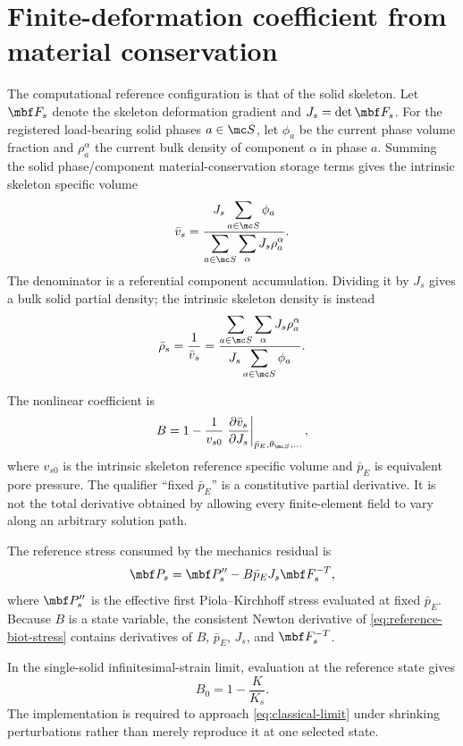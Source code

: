 \section{Finite-deformation coefficient from material conservation}

The computational reference configuration is that of the solid skeleton.  Let
\(\mbf F_s\) denote the skeleton deformation gradient and
\(J_s=\det\mbf F_s\).  For the registered load-bearing solid phases
\(a\in\mc S\), let \(\phi_a\) be the current phase volume fraction and
\(\rho_a^\alpha\) the current bulk density of component \(\alpha\) in phase
\(a\).  Summing the solid phase/component material-conservation storage terms
gives the intrinsic skeleton specific volume
\begin{equation}
 \bar v_s=
 \frac{J_s\displaystyle\sum_{a\in\mc S}\phi_a}
 {\displaystyle\sum_{a\in\mc S}\sum_\alpha J_s\rho_a^\alpha}.
 \label{eq:summed-specific-volume}
\end{equation}
The denominator is a referential component accumulation.  Dividing it by
\(J_s\) gives a bulk solid partial density; the intrinsic skeleton density is
instead
\begin{equation}
 \bar\rho_s=\frac{1}{\bar v_s}=
 \frac{\displaystyle\sum_{a\in\mc S}\sum_\alpha J_s\rho_a^\alpha}
 {J_s\displaystyle\sum_{a\in\mc S}\phi_a}.
 \label{eq:intrinsic-density}
\end{equation}

The nonlinear coefficient is
\begin{equation}
 B=1-\frac{1}{v_{s0}}
 \left.\frac{\partial\bar v_s}{\partial J_s}\right|_{\bar p_E,\theta_{\mc S},\ldots},
 \label{eq:nonlinear-biot}
\end{equation}
where \(v_{s0}\) is the intrinsic skeleton reference specific volume and
\(\bar p_E\) is equivalent pore pressure. The qualifier ``fixed
\(\bar p_E\)'' is a
constitutive partial derivative.  It is not the total derivative obtained by
allowing every finite-element field to vary along an arbitrary solution path.

The reference stress consumed by the mechanics residual is
\begin{equation}
 \mbf P_s=\mbf P_s^{\prime\prime}
 -B \bar p_E J_s\mbf F_s^{-T},
 \label{eq:reference-biot-stress}
\end{equation}
where \(\mbf P_s^{\prime\prime}\) is the effective first
Piola--Kirchhoff stress evaluated at fixed \(\bar p_E\). Because \(B\) is a state
variable, the consistent Newton derivative of \cref{eq:reference-biot-stress}
contains derivatives of \(B\), \(\bar p_E\), \(J_s\), and \(\mbf F_s^{-T}\).

In the single-solid infinitesimal-strain limit, evaluation at the reference
state gives
\begin{equation}
 B_0=1-\frac{K}{K_s}.
 \label{eq:classical-limit}
\end{equation}
The implementation is required to approach \cref{eq:classical-limit} under
shrinking perturbations rather than merely reproduce it at one selected state.

